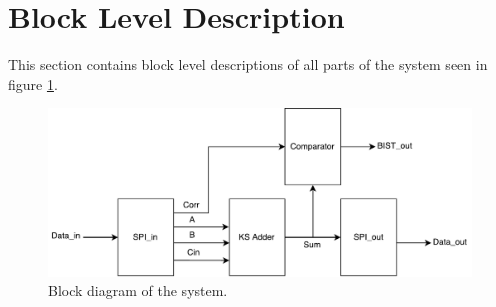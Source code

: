 \section{Block Level Description} \label{sec:block_level}
This section contains block level descriptions of all parts of the system seen in figure \ref{fig:top_level}.

\begin{figure}[H]
  \centering
  \captionsetup{justification=centering}
  \includegraphics[scale=0.5]{../figures/TOP.pdf}
  \caption{Block diagram of the system.} \label{fig:top_level}
\end{figure}
